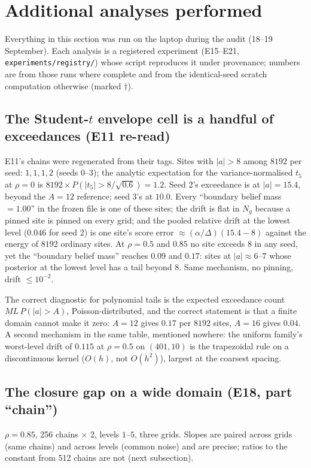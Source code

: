 \section{Additional analyses performed}
\label{sec:analyses}

Everything in this section was run on the laptop during the audit (18--19 September). Each analysis is a registered experiment (E15--E21, \texttt{experiments/registry/}) whose script reproduces it under provenance; numbers are from those runs where complete and from the identical-seed scratch computation otherwise (marked $\dagger$).

\subsection{The Student-$t$ envelope cell is a handful of exceedances (E11 re-read)}
\label{sec:exceed}
E11's chains were regenerated from their tags. Sites with $|a|>8$ among $8192$ per seed: $1, 1, 1, 2$ (seeds 0--3); the analytic expectation for the variance-normalised $t_5$ at $\rho=0$ is $8192\times P(|t_5|>8/\sqrt{0.6})=1.2$. Seed 2's exceedance is at $|a|=15.4$, beyond the $A=12$ reference; seed 3's at $10.0$. Every ``boundary belief mass $=1.00$'' in the frozen file is one of these sites; the drift is flat in $N_g$ because a pinned site is pinned on every grid; and the pooled relative drift at the lowest level ($0.046$ for seed 2) is one site's score error $\approx(\alpha/\Delta)(15.4-8)$ against the energy of $8192$ ordinary sites. At $\rho=0.5$ and $0.85$ no site exceeds $8$ in any seed, yet the ``boundary belief mass'' reaches $0.09$ and $0.17$: sites at $|a|\approx6$--$7$ whose posterior at the lowest level has a tail beyond $8$. Same mechanism, no pinning, drift $\le10^{-2}$.

The correct diagnostic for polynomial tails is the expected exceedance count $ML\,P(|a|>A)$, Poisson-distributed, and the correct statement is that a finite domain cannot make it zero: $A=12$ gives $0.17$ per $8192$ sites, $A=16$ gives $0.04$. A second mechanism in the same table, mentioned nowhere: the uniform family's worst-level drift of $0.115$ at $\rho=0.5$ on $(401,10)$ is the trapezoidal rule on a discontinuous kernel ($O(h)$, not $O(h^2)$), largest at the coarsest spacing.

\subsection{The closure gap on a wide domain (E18, part ``chain'')}
\label{sec:e18}
$\rho=0.85$, 256 chains $\times$ 2, levels $1$--$5$, three grids. Slopes are paired across grids (same chains) and across levels (common noise) and are precise; ratios to the constant from 512 chains are not (next subsection).

